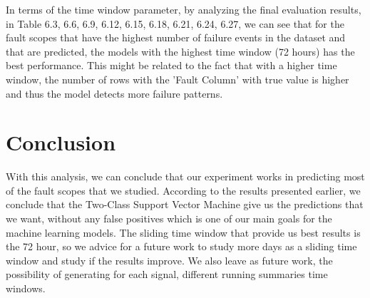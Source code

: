 In terms of the time window parameter, by analyzing the final evaluation results, in Table 6.3, 6.6, 6.9, 6.12, 6.15, 6.18, 6.21, 6.24, 6.27, we can see that for the fault scopes that have the highest number of failure events in the dataset and that are predicted, the models with the highest time window (72 hours) has the best performance. This might be related to the fact that with a higher time window, the number of rows with the 'Fault Column' with true value is higher and thus the model detects more failure patterns.


\section{Conclusion} 
\label{sub:if_you_use_this_template}
With this analysis, we can conclude that our experiment works in predicting most of the fault scopes that we studied. According to the results presented earlier, we conclude that the Two-Class Support Vector Machine give us the predictions that we want, without any false positives which is one of our main goals for the machine learning models. The sliding time window that provide us best results is the 72 hour, so we advice for a future work to study more days as a sliding time window and study if the results improve. We also leave as future work, the possibility of generating for each signal, different running summaries time windows.

